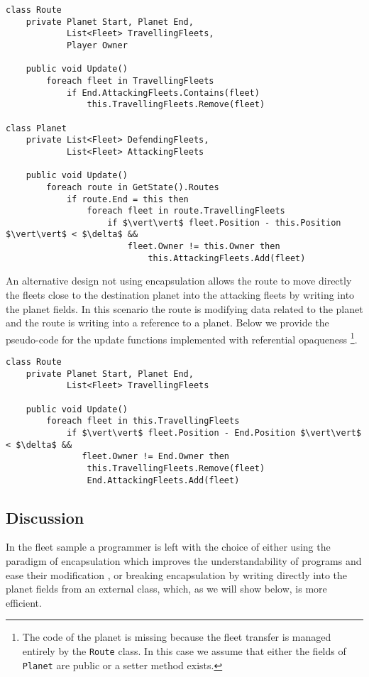 \begin{lstlisting}
class Route
	private Planet Start, Planet End, 
	        List<Fleet> TravellingFleets,
	        Player Owner
	
	public void Update()
		foreach fleet in TravellingFleets
			if End.AttackingFleets.Contains(fleet)
				this.TravellingFleets.Remove(fleet)
				
class Planet
	private List<Fleet> DefendingFleets, 
	        List<Fleet> AttackingFleets
	
	public void Update()
		foreach route in GetState().Routes
			if route.End = this then
				foreach fleet in route.TravellingFleets
					if $\vert\vert$ fleet.Position - this.Position $\vert\vert$ < $\delta$ && 
				  		fleet.Owner != this.Owner then
				   			this.AttackingFleets.Add(fleet)

\end{lstlisting}

An alternative design not using encapsulation allows the route to move directly the fleets close to the destination planet into the attacking fleets by writing into the planet fields. In this scenario the route is modifying data related to the planet and the route is writing into a reference to a planet. Below we provide the pseudo-code for the update functions implemented with referential opaqueness \footnote{The code of the planet is missing because the fleet transfer is managed entirely by the \texttt{Route} class. In this case we assume that either the fields of \texttt{Planet} are public or a setter method exists.}.

\begin{lstlisting}
class Route
	private Planet Start, Planet End, 
	        List<Fleet> TravellingFleets
	
	public void Update()
		foreach fleet in this.TravellingFleets
			if $\vert\vert$ fleet.Position - End.Position $\vert\vert$ < $\delta$ &&
			   fleet.Owner != End.Owner then
				this.TravellingFleets.Remove(fleet)
				End.AttackingFleets.Add(fleet)

\end{lstlisting}

\subsection{Discussion}

In the fleet sample a programmer is left with the choice of either using the paradigm of encapsulation which improves the understandability of programs and ease their modification \cite{ENCAPSULATION_AND_INHERITANCE_IN_OOP}, or breaking encapsulation by writing directly into the planet fields from an external class, which, as we will show below, is more efficient.

